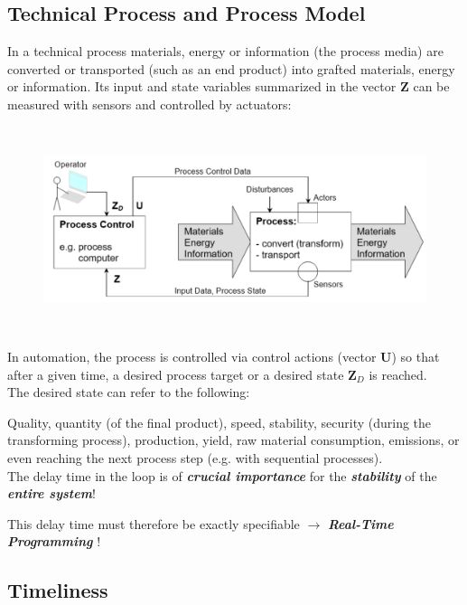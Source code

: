 \subsection{Technical Process and Process Model}


In a technical process materials, energy or information (the process media) are converted or transported (such as an end product) into grafted materials, energy or information. Its input and state variables summarized in the vector \textbf{Z} can be measured with sensors and controlled by actuators: 

\begin{figure}[h]
    \centering
    \includegraphics[width=14cm, height=6cm]{Images/image60.png}
    \label{fig:Fig 6}
\end{figure}

In automation, the process is controlled via control actions (vector \textbf{U}) so that after a given time, a desired process target or a desired state \textbf{Z\textit{${}_{D}$}} is reached. \\

The desired state can refer to the following:

Quality, quantity (of the final product), speed, stability, security (during the transforming process), production, yield, raw material consumption, emissions, or even reaching the next process step (e.g. with sequential processes).\\

The delay time in the loop is of \textbf{\textit{crucial importance}} for the \textbf{\textit{stability}} of the \textbf{\textit{entire system}}!

This delay time must therefore be exactly specifiable $\rightarrow$ \textbf{\textit{Real-Time Programming}} !

\subsection{Timeliness}

